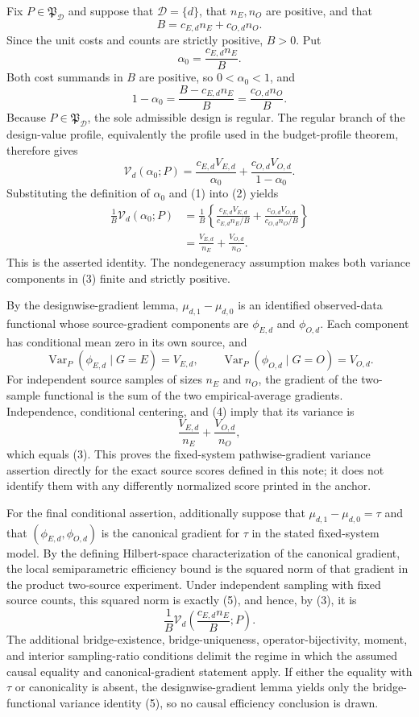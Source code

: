 Fix \(P\in\mathfrak P_{\mathcal D}\) and suppose that \(\mathcal D=\{d\}\), that \(n_E,n_O\) are positive, and that
\[
 B=c_{E,d}n_E+c_{O,d}n_O.
\]
Since the unit costs and counts are strictly positive, \(B>0\).  Put
\[
 \alpha_0=\frac{c_{E,d}n_E}{B}.
\]
Both cost summands in \(B\) are positive, so \(0<\alpha_0<1\), and
\[
 1-\alpha_0
 =\frac{B-c_{E,d}n_E}{B}
 =\frac{c_{O,d}n_O}{B}.                                      \tag{1}
\]
Because \(P\in\mathfrak P_{\mathcal D}\), the sole admissible design is regular.  The regular branch of the design-value profile, equivalently the profile used in the budget-profile theorem, therefore gives
\[
 \mathcal V_d(\alpha_0;P)
 =\frac{c_{E,d}V_{E,d}}{\alpha_0}
  +\frac{c_{O,d}V_{O,d}}{1-\alpha_0}.                         \tag{2}
\]
Substituting the definition of \(\alpha_0\) and (1) into (2) yields
\[
\begin{aligned}
 \frac{1}{B}\mathcal V_d(\alpha_0;P)
 &=\frac{1}{B}\left\{
   \frac{c_{E,d}V_{E,d}}{c_{E,d}n_E/B}
   +\frac{c_{O,d}V_{O,d}}{c_{O,d}n_O/B}
   \right\}\\
 &=\frac{V_{E,d}}{n_E}+\frac{V_{O,d}}{n_O}.                  \tag{3}
\end{aligned}
\]
This is the asserted identity.  The nondegeneracy assumption makes both variance components in (3) finite and strictly positive.

By the designwise-gradient lemma, \(\mu_{d,1}-\mu_{d,0}\) is an identified observed-data functional whose source-gradient components are \(\phi_{E,d}\) and \(\phi_{O,d}\).  Each component has conditional mean zero in its own source, and
\[
 \operatorname{Var}_P(\phi_{E,d}\mid G=E)=V_{E,d},
 \qquad
 \operatorname{Var}_P(\phi_{O,d}\mid G=O)=V_{O,d}.           \tag{4}
\]
For independent source samples of sizes \(n_E\) and \(n_O\), the gradient of the two-sample functional is the sum of the two empirical-average gradients.  Independence, conditional centering, and (4) imply that its variance is
\[
 \frac{V_{E,d}}{n_E}+\frac{V_{O,d}}{n_O},                    \tag{5}
\]
which equals (3).  This proves the fixed-system pathwise-gradient variance assertion directly for the exact source scores defined in this note; it does not identify them with any differently normalized score printed in the anchor.

For the final conditional assertion, additionally suppose that \(\mu_{d,1}-\mu_{d,0}=\tau\) and that \((\phi_{E,d},\phi_{O,d})\) is the canonical gradient for \(\tau\) in the stated fixed-system model.  By the defining Hilbert-space characterization of the canonical gradient, the local semiparametric efficiency bound is the squared norm of that gradient in the product two-source experiment.  Under independent sampling with fixed source counts, this squared norm is exactly (5), and hence, by (3), it is
\[
 \frac{1}{B}\mathcal V_d\!\left(\frac{c_{E,d}n_E}{B};P\right).
\]
The additional bridge-existence, bridge-uniqueness, operator-bijectivity, moment, and interior sampling-ratio conditions delimit the regime in which the assumed causal equality and canonical-gradient statement apply.  If either the equality with \(\tau\) or canonicality is absent, the designwise-gradient lemma yields only the bridge-functional variance identity (5), so no causal efficiency conclusion is drawn.